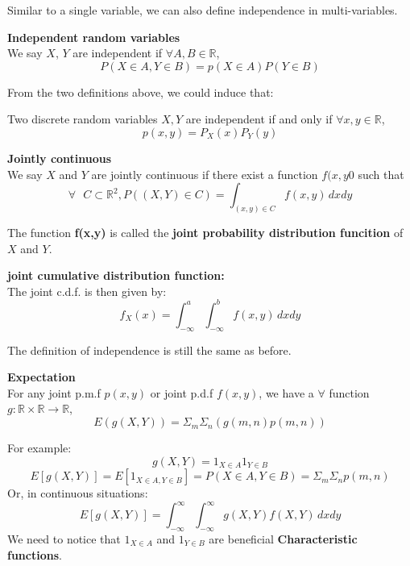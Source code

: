 \documentclass{article}
\begin{document}
Similar to a single variable, we can also define independence in multi-variables.
\begin{definition}
    \textbf{Independent random variables}\\
    We say $X$, $Y$ are independent if $\forall A,B \in \mathbb{R}$, 
    $$ P(X \in A, Y \in B) = p(X \in A)P(Y \in B)$$
\end{definition}

From the two definitions above, we could induce that:
\begin{theorem}
    Two discrete random variables $X,Y$ are independent if and only if $\forall x,y \in \mathbb{R}$,
    $$ p(x,y) = P_X(x)P_Y(y)$$
\end{theorem}



\begin{definition}
    \textbf{Jointly continuous}\\
    We say $X$ and $Y$ are jointly continuous if there exist a function $f(x,y0$ such that 
    $$\forall \text{ } C \subset \mathbb{R}^2, P((X,Y) \in C) = \int_{(x,y) \in C}f(x,y) \,dxdy$$
\end{definition}
The function \textbf{f(x,y)} is called the\textbf{ joint probability distribution funcition }of $X$ and $Y$.\\

\begin{definition}
    \textbf{ joint cumulative distribution function: }\\
    The joint c.d.f. is then given by:
    $$ f_X(x) = \int^a_{-\infty}\int^b_{-\infty} f(x,y)\, dxdy$$
\end{definition}
The definition of independence is still the same as before.

\begin{definition}
    \textbf{Expectation}\\
    For any joint p.m.f $p(x,y)$ or joint p.d.f $f(x,y)$, we have a $\forall$ function $g : \mathbb{R}\times\mathbb{R} \longrightarrow \mathbb{R}$,
    $$ E(g(X,Y)) = \Sigma_m\Sigma_n(g(m,n)p(m,n))$$
\end{definition}

For example:
$$ g(X,Y) = 1_{X \in A}1_{Y \in B}$$
$$ E[g(X,Y)] = E[1_{X \in A, Y \in B}] = P(X \in A, Y \in B) = \Sigma_m\Sigma_np(m,n)$$
Or, in continuous situations:
$$ E[g(X,Y)] = \int^\infty_{-\infty} \int^\infty_{-\infty}g(X,Y)f(X,Y) \, dxdy$$
We need to notice that $1_{X \in A}$ and $1_{Y \in B}$ are beneficial \textbf{Characteristic functions}.
\bigskip
\end{document}
